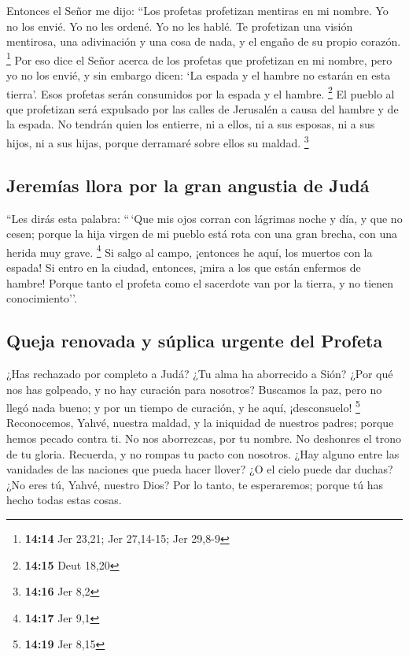 \begin{paracol}{2}
 Entonces el Señor me dijo: ``Los profetas profetizan
mentiras en mi nombre. Yo no los envié. Yo no les ordené. Yo no les
hablé. Te profetizan una visión mentirosa, una adivinación y una cosa de
nada, y el engaño de su propio corazón. \footnote{\textbf{14:14} Jer
  23,21; Jer 27,14-15; Jer 29,8-9}  Por eso dice el Señor
acerca de los profetas que profetizan en mi nombre, pero yo no los
envié, y sin embargo dicen: `La espada y el hambre no estarán en esta
tierra'. Esos profetas serán consumidos por la espada y el hambre.
\footnote{\textbf{14:15} Deut 18,20}  El pueblo al que
profetizan será expulsado por las calles de Jerusalén a causa del hambre
y de la espada. No tendrán quien los entierre, ni a ellos, ni a sus
esposas, ni a sus hijos, ni a sus hijas, porque derramaré sobre ellos su
maldad. \footnote{\textbf{14:16} Jer 8,2}

\hypertarget{jeremuxedas-llora-por-la-gran-angustia-de-juduxe1}{%
\subsection{Jeremías llora por la gran angustia de
Judá}\label{jeremuxedas-llora-por-la-gran-angustia-de-juduxe1}}

 ``Les dirás esta palabra: ``\,`Que mis ojos corran con
lágrimas noche y día, y que no cesen; porque la hija virgen de mi pueblo
está rota con una gran brecha, con una herida muy grave. \footnote{\textbf{14:17}
  Jer 9,1}  Si salgo al campo, ¡entonces he aquí, los
muertos con la espada! Si entro en la ciudad, entonces, ¡mira a los que
están enfermos de hambre! Porque tanto el profeta como el sacerdote van
por la tierra, y no tienen conocimiento''.

\hypertarget{queja-renovada-y-suxfaplica-urgente-del-profeta}{%
\subsection{Queja renovada y súplica urgente del
Profeta}\label{queja-renovada-y-suxfaplica-urgente-del-profeta}}

 ¿Has rechazado por completo a Judá? ¿Tu alma ha
aborrecido a Sión? ¿Por qué nos has golpeado, y no hay curación para
nosotros? Buscamos la paz, pero no llegó nada bueno; y por un tiempo de
curación, y he aquí, ¡desconsuelo! \footnote{\textbf{14:19} Jer 8,15}
 Reconocemos, Yahvé, nuestra maldad, y la iniquidad de
nuestros padres; porque hemos pecado contra ti.  No nos
aborrezcas, por tu nombre. No deshonres el trono de tu gloria. Recuerda,
y no rompas tu pacto con nosotros.  ¿Hay alguno entre las
vanidades de las naciones que pueda hacer llover? ¿O el cielo puede dar
duchas? ¿No eres tú, Yahvé, nuestro Dios? Por lo tanto, te esperaremos;
porque tú has hecho todas estas cosas.


\end{paracol}
